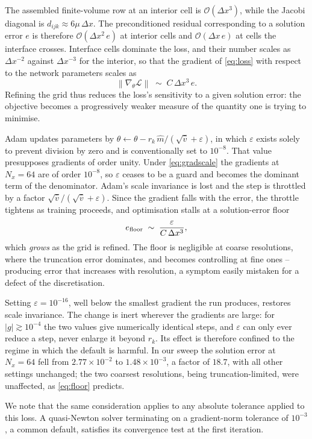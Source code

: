 The assembled finite-volume row at an interior cell is $\mathcal{O}(\Delta x^{3})$,
while the Jacobi diagonal is $d_{ijk} \approx 6\mu\,\Delta x$. The preconditioned
residual corresponding to a solution error $e$ is therefore
$\mathcal{O}(\Delta x^{2}\, e)$ at interior cells and $\mathcal{O}(\Delta x\, e)$ at
cells the interface crosses. Interface cells dominate the loss, and their number scales
as $\Delta x^{-2}$ against $\Delta x^{-3}$ for the interior, so that the gradient of
\eqref{eq:loss} with respect to the network parameters scales as
\begin{equation}
    \left\| \nabla_{\theta}\mathcal{L} \right\| \;\sim\; C\,\Delta x^{3}\, e .
    \label{eq:gradscale}
\end{equation}
Refining the grid thus reduces the loss's sensitivity to a given solution error: the
objective becomes a progressively weaker measure of the quantity one is trying to
minimise.

Adam updates parameters by $\theta \leftarrow \theta - r_k\,\hat{m}/(\sqrt{\hat{v}} +
\varepsilon)$, in which $\varepsilon$ exists solely to prevent division by zero and is
conventionally set to $10^{-8}$. That value presupposes gradients of order unity. Under
\eqref{eq:gradscale} the gradients at $N_x = 64$ are of order $10^{-8}$, so
$\varepsilon$ ceases to be a guard and becomes the dominant term of the denominator.
Adam's scale invariance is lost and the step is throttled by a factor
$\sqrt{\hat{v}}/(\sqrt{\hat{v}} + \varepsilon)$. Since the gradient falls with the
error, the throttle tightens as training proceeds, and optimisation stalls at a
solution-error floor
\begin{equation}
    e_{\rm floor} \;\sim\; \frac{\varepsilon}{C\,\Delta x^{3}},
    \label{eq:floor}
\end{equation}
which \emph{grows} as the grid is refined. The floor is negligible at coarse
resolutions, where the truncation error dominates, and becomes controlling at fine
ones -- producing error that increases with resolution, a symptom easily mistaken for a
defect of the discretisation.

Setting $\varepsilon = 10^{-16}$, well below the smallest gradient the run produces,
restores scale invariance. The change is inert wherever the gradients are large: for
$|g| \gtrsim 10^{-4}$ the two values give numerically identical steps, and $\varepsilon$
can only ever reduce a step, never enlarge it beyond $r_k$. Its effect is therefore
confined to the regime in which the default is harmful. In our sweep the solution error
at $N_x = 64$ fell from $2.77 \times 10^{-2}$ to $1.48 \times 10^{-3}$, a factor of
$18.7$, with all other settings unchanged; the two coarsest resolutions, being
truncation-limited, were unaffected, as \eqref{eq:floor} predicts.

We note that the same consideration applies to any absolute tolerance applied to this
loss. A quasi-Newton solver terminating on a gradient-norm tolerance of $10^{-3}$, a
common default, satisfies its convergence test at the first iteration.
